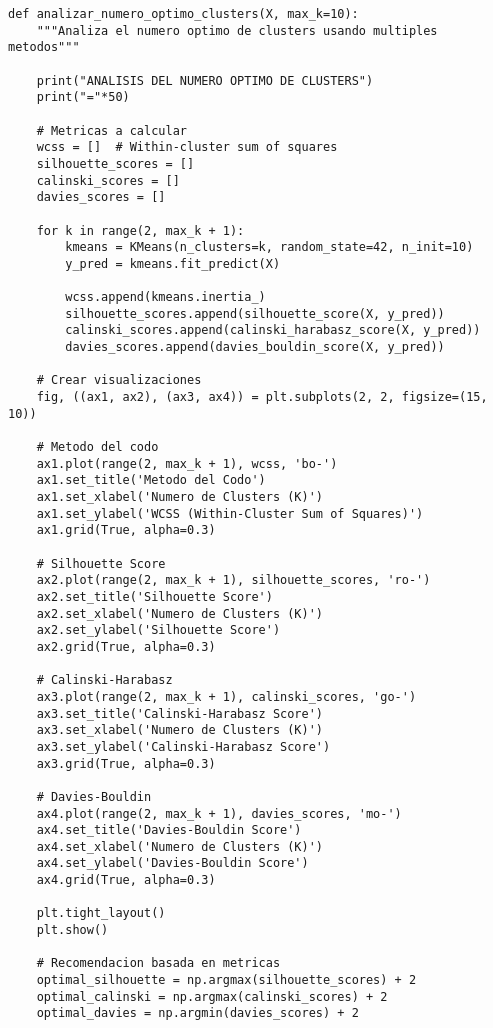 \documentclass[12pt]{article}
\begin{document}
\begin{lstlisting}
def analizar_numero_optimo_clusters(X, max_k=10):
    """Analiza el numero optimo de clusters usando multiples metodos"""
    
    print("ANALISIS DEL NUMERO OPTIMO DE CLUSTERS")
    print("="*50)
    
    # Metricas a calcular
    wcss = []  # Within-cluster sum of squares
    silhouette_scores = []
    calinski_scores = []
    davies_scores = []
    
    for k in range(2, max_k + 1):
        kmeans = KMeans(n_clusters=k, random_state=42, n_init=10)
        y_pred = kmeans.fit_predict(X)
        
        wcss.append(kmeans.inertia_)
        silhouette_scores.append(silhouette_score(X, y_pred))
        calinski_scores.append(calinski_harabasz_score(X, y_pred))
        davies_scores.append(davies_bouldin_score(X, y_pred))
    
    # Crear visualizaciones
    fig, ((ax1, ax2), (ax3, ax4)) = plt.subplots(2, 2, figsize=(15, 10))
    
    # Metodo del codo
    ax1.plot(range(2, max_k + 1), wcss, 'bo-')
    ax1.set_title('Metodo del Codo')
    ax1.set_xlabel('Numero de Clusters (K)')
    ax1.set_ylabel('WCSS (Within-Cluster Sum of Squares)')
    ax1.grid(True, alpha=0.3)
    
    # Silhouette Score
    ax2.plot(range(2, max_k + 1), silhouette_scores, 'ro-')
    ax2.set_title('Silhouette Score')
    ax2.set_xlabel('Numero de Clusters (K)')
    ax2.set_ylabel('Silhouette Score')
    ax2.grid(True, alpha=0.3)
    
    # Calinski-Harabasz
    ax3.plot(range(2, max_k + 1), calinski_scores, 'go-')
    ax3.set_title('Calinski-Harabasz Score')
    ax3.set_xlabel('Numero de Clusters (K)')
    ax3.set_ylabel('Calinski-Harabasz Score')
    ax3.grid(True, alpha=0.3)
    
    # Davies-Bouldin
    ax4.plot(range(2, max_k + 1), davies_scores, 'mo-')
    ax4.set_title('Davies-Bouldin Score')
    ax4.set_xlabel('Numero de Clusters (K)')
    ax4.set_ylabel('Davies-Bouldin Score')
    ax4.grid(True, alpha=0.3)
    
    plt.tight_layout()
    plt.show()
    
    # Recomendacion basada en metricas
    optimal_silhouette = np.argmax(silhouette_scores) + 2
    optimal_calinski = np.argmax(calinski_scores) + 2
    optimal_davies = np.argmin(davies_scores) + 2
    

\end{lstlisting}
\end{document}
